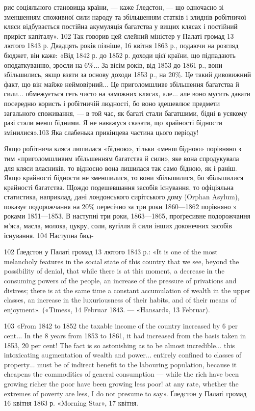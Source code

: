 рис соціяльного становища країни, — каже Ґледстон, — що одночасно
зі зменшенням споживної сили народу та збільшенням
статків і злиднів робітничої кляси відбувається постійна акумуляція
багатства у вищих клясах і постійний приріст капіталу».
102 Так говорив цей єлейний міністер у Палаті громад
13 лютого 1843 р. Двадцять років пізніше, 16 квітня 1863 р.,
подаючи на розгляд бюджет, він каже: «Від 1842 р. до 1852 р.
доходи цієї країни, що підпадають оподаткуванню, зросли на
6\%... За вісім років, від 1853 до 1861 р., вони збільшились, якщо
взяти за основу доходи 1853 р., на 20\%. Це такий дивовижний
факт, що він майже неймовірний... Це приголомшливе збільшення
багатства й сили... обмежується геть чисто на заможних
клясах, але... але воно мусить давати посередню користь і робітничій
людності, бо воно здешевлює предмети загального споживання,
— в той час, як багаті стали багатшими, бідні в усякому
разі стали менш бідними. Я не наважуся сказати, що крайності
бідности змінилися».103 Яка слабенька прикінцева частина цього
періоду!

Якщо робітнича кляса лишилася «бідною», тільки «менш
бідною» порівняно з тим «приголомшливим збільшенням багатства
й сили», яке вона спродукувала для кляси власників, то
відносно вона лишилася так само бідною, як і раніш. Якщо
крайності бідности не зменшилися, то вони збільшилися, бо
збільшилися крайності багатства. Щождо подешевшання засобів
існування, то офіціяльна статистика, наприклад, дані лондонського
сирітського дому (Orphan Asylum), показує подорожчання
на 20\% пересічно за три роки 1860—1862 порівняно з роками
1851—1853. В наступні три роки, 1863—1865, проґресивне
подорожчання м’яса, масла, молока, цукру, соли, вугілля й
сили інших доконечних засобів існування. 104 Наступна бюд-

102 Ґледстон у Палаті громад 13 лютого 1843 р.: «It is one of the
most melancholy features in the social state of this country that we see,
beyond the possibility of denial, that while there is at this moment, a decrease
in the consuming powers of the people, an increase of the pressure
of privations and distress; there is at the same time a constant accumulation
of wealth in the upper classes, an increase in the luxuriousness of their
habits, and of their means of enjoyment». («Times», 14 Februar 1843. —
«Hansard», 13 Februar).

103 «From 1842 to 1852 the taxable income of the country increased by
6 per cent... In the 8 years from 1853 to 1861, it had increased from the
basis taken in 1853, 20 per cent! The fact is so astonishing as to be almost
incredible... this intoxicating augmentation of wealth and power... entirely
confined to classes of property... must be of indirect benefit to the
labouring population, because it cheapens the commodities of general consumption
— while the rich have been growing richer the poor have been
growing less poor! at any rate, whether the extremes of poverty are less,
I do not presume to say». Ґледстон у Палаті громад 16 квітня 1863 р.
«Morning Star», 17 квітня.

